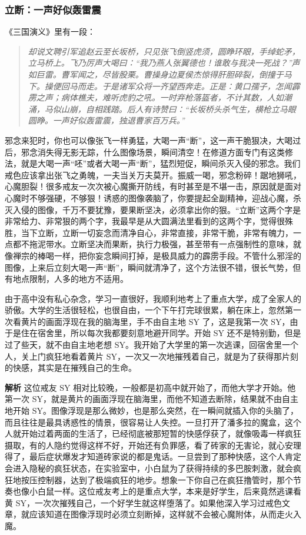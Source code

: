 \subsubsection{立断：一声好似轰雷震}

《三国演义》里有一段：

\begin{quote}\it
    却说文聘引军追赵云至长坂桥，只见张飞倒竖虎须，圆睁环眼，手绰蛇矛，立马桥上。飞乃厉声大喝曰：“我乃燕人张翼德也！谁敢与我决一死战？”声如巨雷。曹军闻之，尽皆股栗。曹操身边夏侯杰惊得肝胆碎裂，倒撞于马下。操便回马而走。于是诸军众将一齐望西奔走。正是：黄口孺子，怎闻霹雳之声；病体樵夫，难听虎豹之吼。一时弃枪落盔者，不计其数，人如潮涌，马似山崩，自相践踏。后人有诗赞曰：“长坂桥头杀气生，横枪立马眼圆睁。一声好似轰雷震，独退曹家百万兵。”
\end{quote}

邪念来犯时，你也可以像张飞一样勇猛，大喝一声“断”，这一声干脆狠决，大喝过后，邪念消失得无影无踪，什么图像场景，瞬间清空！在修道方面专门有这类修法，就是大喝一声“呸”或者大喝一声“断”，猛烈短促，瞬间杀灭入侵的邪念。我们戒色应该拿出张飞之勇魄，一夫当关万夫莫开。振威一喝，邪念粉碎！踞地狮吼，心魔胆裂！很多戒友一次次被心魔撕开防线，有时甚至是不堪一击，原因就是面对心魔时不够强硬，不够狠！诱惑的图像袭脑了，你要提起全副精神，迎战心魔，杀灭入侵的图像，千万不要犹豫，要果断坚决，必须拿出你的狠。“立断”这两个字是非常给力、非常狠的两个字，我最早是从大圆满法里看到的这两个字，觉得很殊胜，当下立断，立断一切妄念而清净自心，非常直接，非常干脆，非常有魄力，一点都不拖泥带水。立断坚决而果断，执行力极强，甚至带有一点强制性的意味，就像禅宗的棒喝一样，把你妄念瞬间打掉，是极具威力的霹雳手段。不管什么邪淫的图像，上来后立刻大喝一声“断”，瞬间就清净了，这个方法很不错，很长气势，但有地点限制，人多的地方不适用。

\begin{case}
    由于高中没有私心杂念，学习一直很好，我顺利地考上了重点大学，成了全家人的骄傲。大学的生活很轻松，也很自由，一个下午打完球很累，躺在床上，忽然第一次看黄片的画面浮现在我的脑海里，手不由自主地 SY 了，这是我第一次 SY，由于是住在宿舍里，所以每次我都要刻意地避开同学。开始 SY 还不是特别勤，但是过了些天，就不由自主地老想 SY。我开始了大学里的第一次逃课，回宿舍里一个人，关上门疯狂地看着黄片 SY，一次又一次地摧残着自己，就是为了获得那片刻的快感，其实是在摧残自己的生命。

    \textbf{解析} 这位戒友 SY 相对比较晚，一般都是初高中就开始了，而他大学才开始。他第一次 SY，就是黄片的画面浮现在脑海里，而他不知道去断除，结果就不由自主地开始 SY。图像浮现是那么微妙，也是那么突然，在一瞬间就插入你的头脑了，而且往往是最具诱惑性的情景，很容易让人失控。一旦打开了潘多拉的魔盒，这个人就开始过着两面的生活了，已经彻底被那短暂的快感俘获了，就像吸毒一样疯狂摄取，有的人隐约觉得这样不好，开始还有负罪感，看了砖家的无害论，就心安理得了，最后症状爆发才知道砖家说的都是鬼话。一旦尝到了那种快感，这个人肯定会进入隐秘的疯狂状态，在实验室中，小白鼠为了获得持续的多巴胺刺激，就会疯狂地按压控制器，达到了极端疯狂的地步。想象一下你自己在疯狂撸管时，那个节奏也像小白鼠一样。这位戒友考上的是重点大学，本来是好学生，后来竟然逃课看黄 SY，一次次摧残自己，一个好学生就这样堕落了。如果他深入学习过戒色文章，就应该知道在图像浮现时必须立刻断掉，这样就不会被心魔附体，从而走火入魔。
\end{case}

